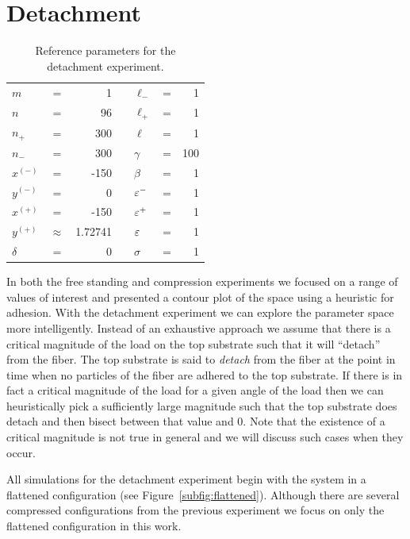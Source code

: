 \section{Detachment} \label{ch:detachment}

	\begin{table}[t]
		\centering
		\caption{Reference parameters for the detachment experiment. \label{table:detachment_reference}}
		\begin{tabular}{lcrclcr}
			$m$ & = & 1 & \hspace{1in} & $\ell_-$ & = & 1 \\
			$n$ & = & 96 & & $\ell_+$ & = & 1 \\
			$n_+$ & = & 300 & & $\ell$ & = & 1 \\
			$n_-$ & = & 300 & & $\gamma$ & = & 100 \\
			$x^{(-)}$ & = & -150 & & $\beta$ & = & 1 \\
			$y^{(-)}$ & = & 0 & & $\varepsilon^-$ & = & 1 \\
			$x^{(+)}$ & = & -150 & & $\varepsilon^+$ & = & 1 \\
			$y^{(+)}$ & $\approx$ & 1.72741 & & $\varepsilon$ & = & 1 \\
			$\delta$ & = & 0 & & $\sigma$ & = & 1
		\end{tabular}
	\end{table}

In both the free standing and compression experiments we focused on a range of values of interest and presented a contour plot of the space using a heuristic for adhesion. With the detachment experiment we can explore the parameter space more intelligently. Instead of an exhaustive approach we assume that there is a critical magnitude of the load on the top substrate such that it will ``detach'' from the fiber. The top substrate is said to \textit{detach} from the fiber at the point in time when no particles of the fiber are adhered to the top substrate. If there is in fact a critical magnitude of the load for a given angle of the load then we can heuristically pick a sufficiently large magnitude such that the top substrate does detach and then bisect between that value and $0$. Note that the existence of a critical magnitude is not true in general and we will discuss such cases when they occur.

All simulations for the detachment experiment begin with the system in a flattened configuration (see Figure~\ref{subfig:flattened}). Although there are several compressed configurations from the previous experiment we focus on only the flattened configuration in this work.
	
